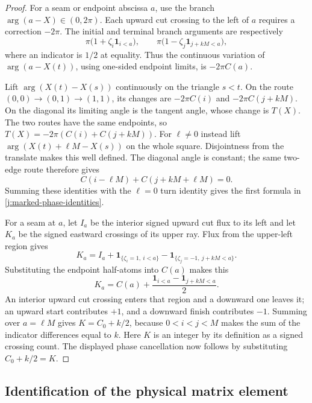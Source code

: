 \begin{proof}
For a seam or endpoint abscissa $a$, use the branch
$\arg(a-X)\in(0,2\pi)$. Each upward cut crossing
to the left of $a$ requires a correction $-2\pi$. The initial and
terminal branch arguments are respectively
\[
 \pi\bigl(1+\zeta_i\mathbf1_{i<a}\bigr),\qquad
 \pi\bigl(1-\zeta_j\mathbf1_{j+kM<a}\bigr),
\]
where an indicator is $1/2$ at equality. Thus the continuous
variation of $\arg(a-X(t))$, using one-sided endpoint limits, is
$-2\pi C(a)$.

Lift $\arg(X(t)-X(s))$ continuously on the triangle $s<t$.
On the route $(0,0)\to(0,1)\to(1,1)$, its changes are
$-2\pi C(i)$ and $-2\pi C(j+kM)$. On the diagonal its limiting
angle is the tangent angle, whose change is $T(X)$. The two routes
have the same endpoints, so
$T(X)=-2\pi(C(i)+C(j+kM))$. For $\ell\ne0$ instead lift
$\arg(X(t)+\ell M-X(s))$ on the whole square. Disjointness from
the translate makes this well defined. The diagonal angle is
constant; the same two-edge route therefore gives
\[
 C(i-\ell M)+C(j+kM+\ell M)=0.
\]
Summing these identities with the $\ell=0$ turn identity gives the
first formula in \eqref{j:marked-phase-identities}.

For a seam at $a$, let $I_a$ be the interior signed upward cut
flux to its left and let $K_a$ be the signed eastward crossings
of its upper ray. Flux from the upper-left region gives
\[
 K_a=I_a+\mathbf1_{\{\zeta_i=1,\ i<a\}}
          -\mathbf1_{\{\zeta_j=-1,\ j+kM<a\}}.
\]
Substituting the endpoint half-atoms into $C(a)$ makes this
\[
 K_a=
 C(a)+\frac{\mathbf1_{i<a}-\mathbf1_{j+kM<a}}2.
\]
An interior upward cut crossing enters that region and a
downward one leaves it; an upward start contributes $+1$, and
a downward finish contributes $-1$. Summing over $a=\ell M$
gives $K=C_0+k/2$, because
$0<i<j<M$ makes the sum of the indicator differences equal to
$k$. Here $K$ is an integer by its definition as a signed crossing
count. The displayed phase cancellation now follows by substituting
$C_0+k/2=K$.
\end{proof}

\subsection{Identification of the physical matrix element}

